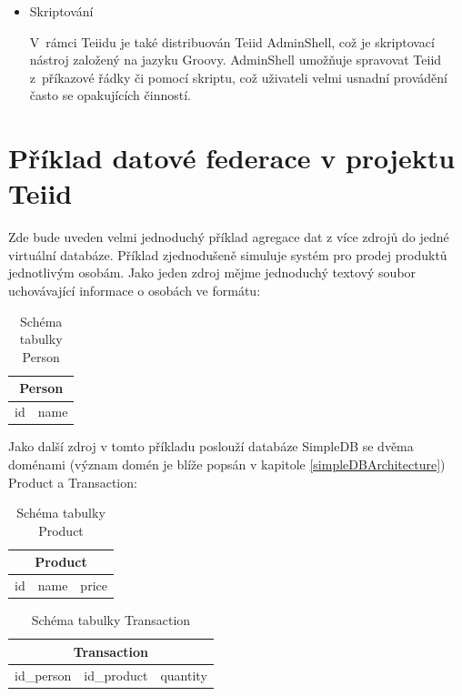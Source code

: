 \documentclass[oneside,12pt]{fithesis2}
\begin{document}
\begin{itemize}
\begin{itemize}
  \item Skriptování
  
  V~rámci Teiidu je také distribuován Teiid AdminShell, což je skriptovací nástroj založený na jazyku Groovy. AdminShell umožňuje spravovat Teiid z~příkazové řádky či pomocí skriptu, což uživateli velmi usnadní provádění často se opakujících činností.
  
  \end{itemize}

\end{itemize}

\section{Příklad datové federace v projektu Teiid}
Zde bude uveden velmi jednoduchý příklad agregace dat z více zdrojů do jedné virtuální databáze. Příklad zjednodušeně simuluje systém pro prodej produktů jednotlivým osobám. 
Jako jeden zdroj mějme jednoduchý textový soubor uchovávající informace o osobách ve formátu:
\begin{table}[h]
\centering
 \begin{tabular}{|c|c|}
 \hline
 \multicolumn{2}{|c|}{Person} \\
 \hline
 id & name \\
 \hline
\end{tabular}
  \caption{Schéma tabulky Person}
 \label{personTable}
\end{table}

Jako další zdroj v tomto příkladu poslouží databáze SimpleDB se dvěma doménami (význam domén je  blíže popsán v kapitole \ref{simpleDBArchitecture}) Product a Transaction:
\begin{table}[h]
\centering
\begin{tabular}{|c|c|c|}
 \hline
 \multicolumn{3}{|c|}{Product} \\
 \hline
 id & name & price \\
 \hline
\end{tabular}
  \caption{Schéma tabulky Product}
 \label{productTable}
\end{table}
\begin{table}[h]
\centering
\begin{tabular}{|c|c|c|}
 \hline
 \multicolumn{3}{|c|}{Transaction} \\
 \hline
 id\_person & id\_product &  quantity \\
 \hline
\end{tabular}
\caption{Schéma tabulky Transaction}
\label{transactionTable}
\end{table}
\end{document}
